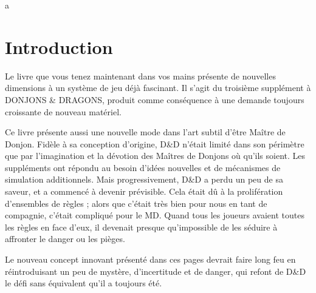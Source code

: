 \documentclass[11pt]{article}
\begin{document}
{\color{white}a}

\newpage

\section*{Introduction}

Le livre que vous tenez maintenant dans vos mains présente de nouvelles dimensions à un système de jeu déjà fascinant. Il s'agit du troisième supplément à DONJONS \& DRAGONS, produit comme conséquence à une demande toujours croissante de nouveau matériel.

Ce livre présente aussi une nouvelle mode dans l'art subtil d'être Maître de Donjon. Fidèle à sa conception d'origine, D\&D n'était limité dans son périmètre que par l'imagination et la dévotion des Maîtres de Donjons où qu'ils soient. Les suppléments ont répondu au besoin d'idées nouvelles et de mécanismes de simulation additionnels. Mais progressivement, D\&D a perdu un peu de sa saveur, et a commencé à devenir prévisible. Cela était dû à la prolifération d'ensembles de règles ; alors que c'était très bien pour nous en tant de compagnie, c'était compliqué pour le MD. Quand tous les joueurs avaient toutes les règles en face d'eux, il devenait presque qu'impossible de les séduire à affronter le danger ou les pièges.

Le nouveau concept innovant présenté dans ces pages devrait faire long feu en réintroduisant un peu de mystère, d'incertitude et de danger, qui refont de D\&D le défi sans équivalent qu'il a toujours été.
\end{document}
